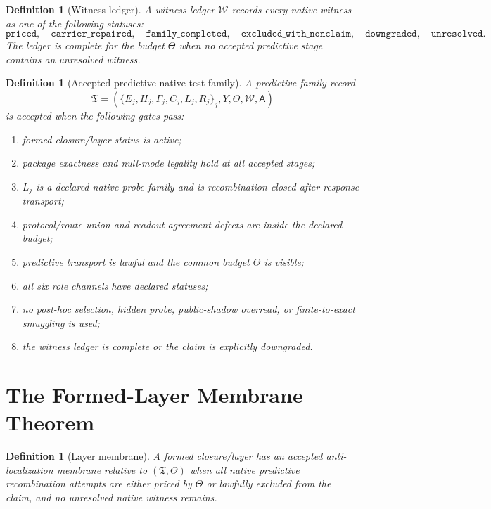\documentclass[11pt]{article}
\newtheorem{definition}[theorem]{Definition}
\begin{document}
\begin{definition}[Witness ledger]
A witness ledger $\mathcal W$ records every native witness as one of the following statuses:
\[
\texttt{priced},\quad
\texttt{carrier\_repaired},\quad
\texttt{family\_completed},\quad
\texttt{excluded\_with\_nonclaim},\quad
\texttt{downgraded},\quad
\texttt{unresolved}.
\]
The ledger is complete for the budget $\Theta$ when no accepted predictive stage contains an unresolved witness.
\end{definition}

\begin{definition}[Accepted predictive native test family]
A predictive family record
\[
  \mathfrak T=(\{E_j,H_j,\Gamma_j,C_j,L_j,R_j\}_j,Y,\Theta,\mathcal W,\mathsf A)
\]
is accepted when the following gates pass:
\begin{enumerate}[label=(G\arabic*)]
\item formed closure/layer status is active;
\item package exactness and null-mode legality hold at all accepted stages;
\item $L_j$ is a declared native probe family and is recombination-closed after response transport;
\item protocol/route union and readout-agreement defects are inside the declared budget;
\item predictive transport is lawful and the common budget $\Theta$ is visible;
\item all six role channels have declared statuses;
\item no post-hoc selection, hidden probe, public-shadow overread, or finite-to-exact smuggling is used;
\item the witness ledger is complete or the claim is explicitly downgraded.
\end{enumerate}
\end{definition}

\section{The Formed-Layer Membrane Theorem}

\begin{definition}[Layer membrane]
A formed closure/layer has an accepted anti-localization membrane relative to $(\mathfrak T,\Theta)$ when all native predictive recombination attempts are either priced by $\Theta$ or lawfully excluded from the claim, and no unresolved native witness remains.
\end{definition}
\end{document}
